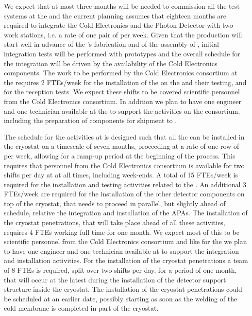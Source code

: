 We expect that at most three months will be needed to commission
all the test systems at the  and the current planning
assumes that eighteen months are required to integrate the Cold
Electronics and the Photon Detector with two work stations, i.e.
a rate of one pair of  per week. Given that the 
production will start well in advance of the 's fabrication
and of the assembly of , initial integration tests will 
be performed with  prototypes and the overall schedule
for the integration will be driven by the availability of the Cold
Electronics components. The work to be performed by the Cold Electronics
consortium at the  requires 2 FTEs/week for the installation 
of the  on the  and their testing, and for 
the  reception tests. We expect these shifts to be covered 
scientific personnel  from the Cold Electronics consortium. In addition 
we plan to have one engineer and one technician available at the 
 to support the activities on the consortium, including 
the preparation of components for shipment to \surf.

The schedule for the activities at \surf is designed such that all the
 can be installed in the cryostat on a timescale of seven
months, proceeding at a rate of one row of  per week, allowing
for a ramp-up period at the beginning of the process. This
requires that personnel from the Cold Electronics consortium is available
for two shifts per day at \surf at all times, including week-ends. A
total of 15 FTEs/week is required for the installation and testing 
activities related to the . An additional 3 FTEs/week are
required for the installation of the other detector components on
top of the cryostat, that needs to proceed in parallel, but slightly
ahead of schedule, relative the integration and installation of the
APAs. The installation of the cryostat penetrations, that will take
place ahead of all these activities, requires 4 FTEs working full time
for one month. We expect most of this to be scientific personnel from
the Cold Electronics consortium and like for the  we plan
to have one engineer and one technician available at \surf to support
the integration and installation activities. For the installation of
the cryostat penetrations a team of 8 FTEs is required, split over
two shifts per day, for a period of one month, that will occur at
the latest during the installation of the detector support structure
inside the cryostat. The installation of the cryostat penetrations
could be scheduled at an earlier date, possibly starting as soon 
as the welding of the cold membrane is completed in part of the cryostat.

